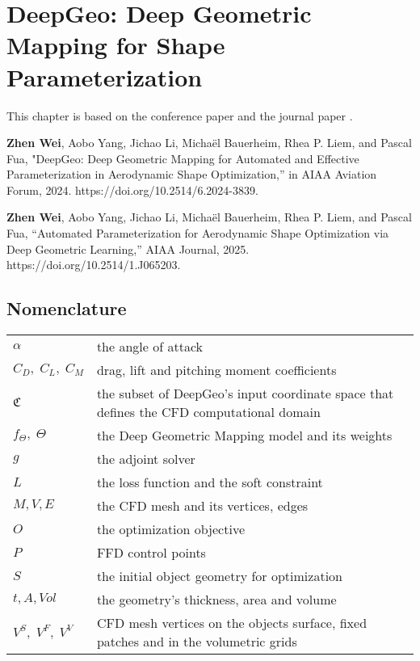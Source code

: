\chapter{DeepGeo: Deep Geometric Mapping for Shape Parameterization}
\label{ch5}

This chapter is based on the conference paper \cite{aa.Wei2024b} and the journal paper \cite{aa.Wei2025}.

\textbf{Zhen Wei}, Aobo Yang, Jichao Li, Michaël Bauerheim, Rhea P. Liem, and Pascal Fua, "DeepGeo: Deep Geometric Mapping for Automated and Effective Parameterization in Aerodynamic Shape Optimization,” in AIAA Aviation Forum, 2024. https://doi.org/10.2514/6.2024-3839. 

\textbf{Zhen Wei}, Aobo Yang, Jichao Li, Michaël Bauerheim, Rhea P. Liem, and Pascal Fua, “Automated Parameterization for Aerodynamic Shape Optimization via Deep Geometric Learning,” AIAA Journal, 2025. https://doi.org/10.2514/1.J065203.

\section{Nomenclature}

{\renewcommand\arraystretch{1.0}
\noindent\begin{longtable*}{@{}l @{\quad=\quad} p{0.8\textwidth}@{}}
$\alpha$            &  the angle of attack \\
$C_D,\;C_L,\;C_{M}$&  drag, lift and pitching moment coefficients\\
$\mathfrak{C}$       &  the subset of DeepGeo's input coordinate space that defines the CFD computational domain \\
$f_\Theta,\;\Theta$ &  the Deep Geometric Mapping model and its weights \\
$g$                 &  the adjoint solver \\
$L$                 &  the loss function and the soft constraint \\
$M, V, E$           &  the CFD mesh and its vertices, edges \\
$O$                 &  the optimization objective \\
$P$                 &  FFD control points \\
$S$                 &  the initial object geometry for optimization \\
$t,A,Vol$             &  the geometry's thickness, area and volume \\
$V^S,\;V^F,\;V^V$   &  CFD mesh vertices on the objects surface, fixed patches and in the volumetric grids
\end{longtable*}}









